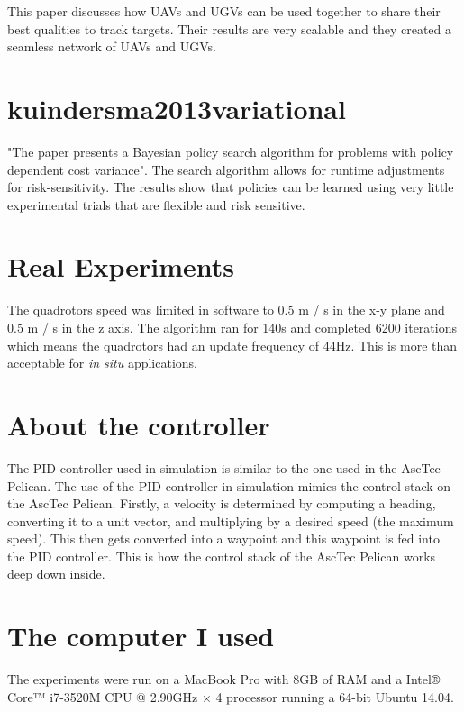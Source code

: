 \documentclass{article}
\begin{document}
This paper discusses how UAVs and UGVs can be used together to share their best
qualities to track targets. Their results are very scalable and they created a
seamless network of UAVs and UGVs.

\section{kuindersma2013variational~\cite{kuindersma2013variational}}

"The paper presents a Bayesian policy search algorithm for problems with policy
dependent cost variance". The search algorithm allows for runtime adjustments
for risk-sensitivity. The results show that policies can be learned using very
little experimental trials that are flexible and risk sensitive.

\section{Real Experiments}

The quadrotors speed was limited in software to 0.5 m / s in the x-y plane and
0.5 m / s in the z axis. The algorithm ran for 140s and completed 6200
iterations which means the quadrotors had an update frequency of 44Hz. This is
more than acceptable for \emph{in situ} applications.

\section{About the controller}

The PID controller used in simulation is similar to the one used in the AscTec
Pelican. The use of the PID controller in simulation mimics the control stack
on the AscTec Pelican. Firstly, a velocity is determined by computing a
heading, converting it to a unit vector, and multiplying by a desired speed
(the maximum speed). This then gets converted into a waypoint and this waypoint
is fed into the PID controller. This is how the control stack of the AscTec
Pelican works deep down inside.

\section{The computer I used}

The experiments were run on a MacBook Pro with 8GB of RAM and a Intel® Core™
i7-3520M CPU @ 2.90GHz × 4 processor running a 64-bit Ubuntu 14.04.

 
\end{document}
